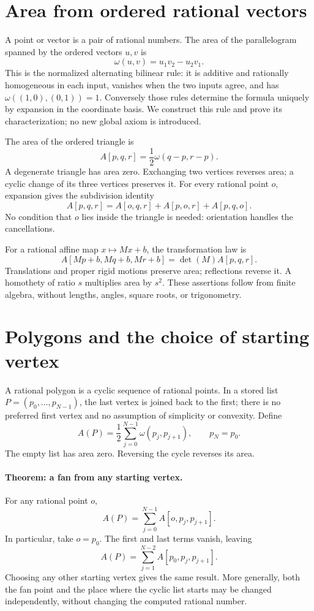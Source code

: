 \section{Area from ordered rational vectors}
\label{sec:rational-area}
A point or vector is a pair of rational numbers. The area of the
parallelogram spanned by the ordered vectors $u,v$ is
\[
 \omega(u,v)=u_1v_2-u_2v_1.
\]
This is the normalized alternating bilinear rule: it is additive and
rationally homogeneous in each input, vanishes when the two inputs agree,
and has $\omega((1,0),(0,1))=1$. Conversely those rules determine the
formula uniquely by expansion in the coordinate basis. We construct this
rule and prove its characterization; no new global axiom is introduced.

The area of the ordered triangle is
\[
 A[p,q,r]=\frac12\omega(q-p,r-p).
\]
A degenerate triangle has area zero. Exchanging two vertices reverses area;
a cyclic change of its three vertices preserves it. For every rational
point $o$, expansion gives the subdivision identity
\[
 A[p,q,r]=A[o,q,r]+A[p,o,r]+A[p,q,o].
\]
No condition that $o$ lies inside the triangle is needed: orientation handles
the cancellations.

For a rational affine map $x\mapsto Mx+b$, the transformation law is
\[
 A[Mp+b,Mq+b,Mr+b]=\det(M)A[p,q,r].
\]
Translations and proper rigid motions preserve area; reflections reverse it.
A homothety of ratio $s$ multiplies area by $s^2$. These assertions follow
from finite algebra, without lengths, angles, square roots, or trigonometry.

\section{Polygons and the choice of starting vertex}
\label{sec:rational-polygons}
A rational polygon is a cyclic sequence of rational points. In a stored list
$P=(p_0,\ldots,p_{N-1})$, the last vertex is joined back to the first;
there is no preferred first vertex and no assumption of simplicity or convexity.
Define
\[
 A(P)=\frac12\sum_{j=0}^{N-1}\omega(p_j,p_{j+1}),
 \qquad p_N=p_0.
\]
The empty list has area zero. Reversing the cycle reverses its area.

\paragraph{Theorem: a fan from any starting vertex.}
\label{thm:rational-polygon-fans}
For any rational point $o$,
\[
 \boxed{A(P)=\sum_{j=0}^{N-1}A[o,p_j,p_{j+1}].}
\]
In particular, take $o=p_0$. The first and last terms vanish, leaving
\[
 A(P)=\sum_{j=1}^{N-2}A[p_0,p_j,p_{j+1}].
\]
Choosing any other starting vertex gives the same result. More generally,
both the fan point and the place where the cyclic list starts may be changed
independently, without changing the computed rational number.

